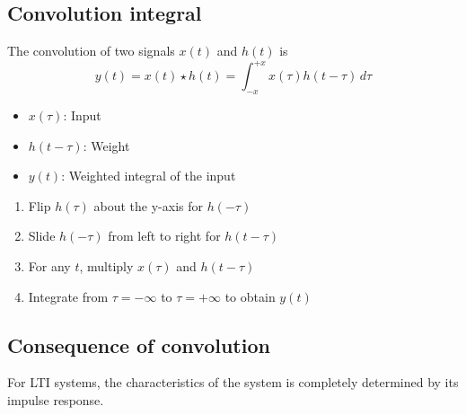 \subsection{Convolution integral}
\begin{definition}
    The convolution of two signals $x(t)$ and $h(t)$ is 
    \begin{equation}
        y(t) = x(t) \star h(t) = \int_{-x}^{+x} x(\tau) h(t - \tau) \, d\tau
    \end{equation}
    \begin{itemize}
        \item $x(\tau)$: Input 
        \item $h(t-\tau)$: Weight
        \item $y(t)$: Weighted integral of the input 
    \end{itemize}
\end{definition}

\begin{process}
    \begin{enumerate}
        \item Flip $h(\tau)$ about the y-axis for $h(-\tau)$
        \item Slide $h(-\tau)$ from left to right for $h(t-\tau)$
        \item For any $t$, multiply $x(\tau)$ and $h(t-\tau)$ 
        \item Integrate from $\tau = -\infty$ to $\tau = +\infty$ to obtain $y(t)$
    \end{enumerate}
\end{process}

\subsection{Consequence of convolution}
\begin{intuition}
    For LTI systems, the characteristics of the system is completely determined by its impulse response.
\end{intuition}
